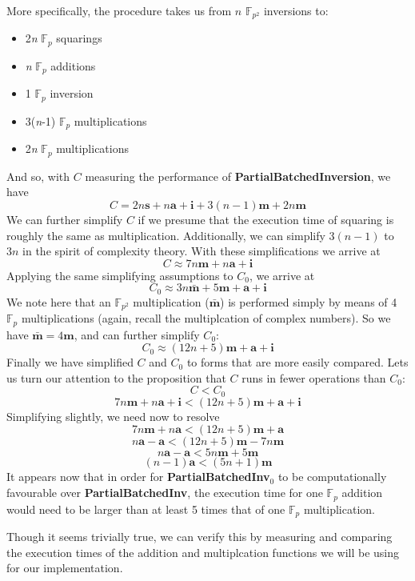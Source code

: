 More specifically, the procedure takes us from $n$ $\mathbb{F}_{p^{2}}$  inversions to:
\begin{center}
\begin{itemize}
\item 2\textit{n} $\mathbb{F}_{p}$ squarings
\item \textit{n} $\mathbb{F}_{p}$ additions
\item 1 $\mathbb{F}_{p}$ inversion
\item 3(\textit{n}-1) $\mathbb{F}_{p}$ multiplications
\item 2\textit{n} $\mathbb{F}_{p}$ multiplications
\end{itemize}
\end{center}
\noindent
And so, with $C$ measuring the performance of \textbf{PartialBatchedInversion}, we have
$$
C = 2n\textbf{s} + n\textbf{a} + \textbf{i} + 3(n-1)\textbf{m} + 2n\textbf{m}
$$
We can further simplify $C$ if we presume that the execution time of squaring is roughly the same as multiplication. Additionally, we can simplify $3(n-1)$ to $3n$ in the spirit of complexity theory. With these simplifications we arrive at
$$
C \approx 7n\textbf{m} + n\textbf{a} + \textbf{i}
$$
Applying the same simplifying assumptions to $C_0$, we arrive at
$$
C_0 \approx 3n\bar{\textbf{m}} + 5\textbf{m} + \textbf{a} + \textbf{i}
$$
We note here that an $\mathbb{F}_{p^2}$ multiplication ($\bar{\textbf{m}}$) is performed simply by means of 4 $\mathbb{F}_{p}$ multiplications (again, recall the multiplcation of complex numbers). So we have $\bar{\textbf{m}} = 4\textbf{m}$, and can further simplify $C_0$:
$$
C_0 \approx (12n + 5)\textbf{m} + \textbf{a} + \textbf{i}
$$
Finally we have simplified $C$ and $C_0$ to forms that are more easily compared. Lets us turn our attention to the proposition that $C$ runs in fewer operations than $C_0$:
$$
C < C_0
$$
$$
7n\textbf{m} + n\textbf{a} + \textbf{i} < (12n + 5)\textbf{m} + \textbf{a} + \textbf{i}
$$
Simplifying slightly, we need now to resolve
$$
7n\textbf{m} + n\textbf{a} < (12n + 5)\textbf{m} + \textbf{a}
$$
$$
n\textbf{a} - \textbf{a} < (12n + 5)\textbf{m} - 7n\textbf{m}
$$
$$
n\textbf{a} - \textbf{a} < 5n\textbf{m} + 5\textbf{m}
$$
$$
(n - 1)\textbf{a} < (5n + 1)\textbf{m}
$$
It appears now that in order for \textbf{PartialBatchedInv}$_0$ to be computationally favourable over \textbf{PartialBatchedInv}, the execution time for one $\mathbb{F}_p$ addition would need to be larger than at least 5 times that of one $\mathbb{F}_p$ multiplication.

Though it seems trivially true, we can verify this by measuring and comparing the execution times of the \sidh addition and multiplcation functions we will be using for our implementation.

